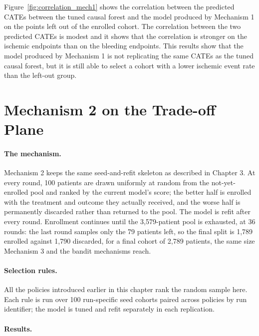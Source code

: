 Figure~\ref{fig:correlation_mech1} shows the correlation between the predicted CATEs between the tuned causal forest and the model 
produced by Mechanism 1 on the points left out of the enrolled cohort.
The correlation between the two predicted 
CATEs is modest and it shows that the correlation is stronger on the ischemic endpoints than on the
bleeding endpoints.
This results show that the model produced by Mechanism 1 is not replicating the same 
CATEs as the tuned causal forest, but it is still able to select a cohort with 
a lower ischemic event rate than the left-out group.


\section{Mechanism 2 on the Trade-off Plane}

\paragraph{The mechanism.}
Mechanism 2 keeps the same seed-and-refit skeleton as described in
Chapter 3. At every round, 100 patients are drawn uniformly at random from the
not-yet-enrolled pool and ranked by the current model's score; the better half is enrolled
with the treatment and outcome they actually received, and the worse half is permanently
discarded rather than returned to the pool. The model is refit after every round.
Enrollment continues until the 3,579-patient pool is exhausted, at 36 rounds: the last
round samples only the 79 patients left, so the final split is 1,789 enrolled against
1,790 discarded, for a final cohort of 2,789 patients, the same size Mechanism 3 and the
bandit mechanisms reach.

\paragraph{Selection rules.}
All the policies introduced earlier in this chapter rank the random sample here.
Each rule is run over 100 run-specific seed cohorts paired across policies by run
identifier; the model is tuned and refit separately in each replication.

\paragraph{Results.}

